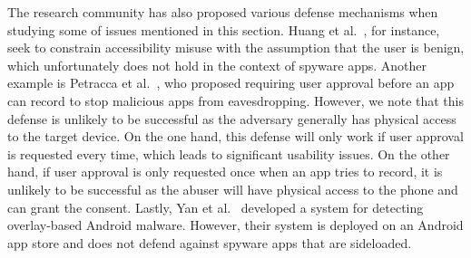 \documentclass[sigconf,balance=false]{acmart}
\newcommand{\alex}[1]{\textcolor{chicagomaroon}{\noindent[AL: #1]}}
\newcommand{\damon}[1]{\textcolor{blue}{\noindent[DM: #1]}}
\newcommand{\grant}[1]{\textsf{\textcolor{teal}{[GH: #1]}}}
\newcommand{\geoff}[1]{\textcolor{purple}{\noindent[GV: #1]}}
\newcommand{\alex}[1]{}
\newcommand{\grant}[1]{}
\newcommand{\geoff}[1]{}
\newcommand{\damon}[1]{}
\begin{document}
The research community has also proposed various defense mechanisms when
studying some of issues mentioned in this section. Huang et
al.~\cite{huang2021a11y}, for instance, seek to constrain accessibility misuse
with the assumption that the user is benign, which unfortunately does not hold
in the context of spyware apps.
Another example is Petracca et
al.~\cite{petracca2015audroid}, who proposed requiring user approval before an
app can record to stop malicious apps from eavesdropping. However, we note that
this defense is unlikely to be successful as the adversary generally has physical access to the target device. On the one
hand, this defense will only work if user approval is requested every time,
which leads to significant usability issues. On the other hand, if user approval is
only requested once when an app tries to record, it is unlikely to be successful
as the abuser will have physical access to the phone and can grant the consent. Lastly, Yan et al.~\cite{yan2019understanding} developed a system for detecting overlay-based Android malware. However, their system is deployed on an Android app store and does not defend against spyware apps that are sideloaded.




\end{document}
